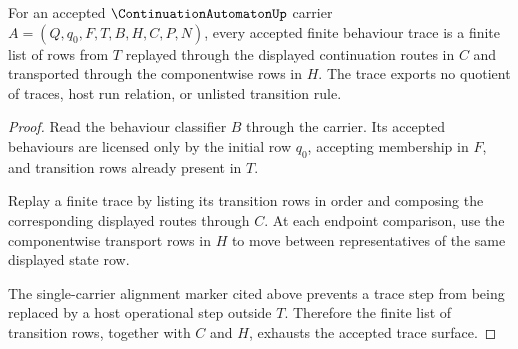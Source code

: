 \begin{theorem}\label{thm:continuation-automaton-trace-exhaustion}
For an accepted $\ContinuationAutomatonUp$ carrier $A=(Q,q_0,F,T,B,H,C,P,N)$, every accepted finite behaviour trace is a finite list of rows from $T$ replayed through the displayed continuation routes in $C$ and transported through the componentwise rows in $H$. The trace exports no quotient of traces, host run relation, or unlisted transition rule.
\end{theorem}
\begin{proof}
Read the behaviour classifier $B$ through the carrier. Its accepted behaviours are licensed only by the initial row $q_0$, accepting membership in $F$, and transition rows already present in $T$.

Replay a finite trace by listing its transition rows in order and composing the corresponding displayed routes through $C$. At each endpoint comparison, use the componentwise transport rows in $H$ to move between representatives of the same displayed state row.

The single-carrier alignment marker cited above prevents a trace step from being replaced by a host operational step outside $T$. Therefore the finite list of transition rows, together with $C$ and $H$, exhausts the accepted trace surface.
\end{proof}

